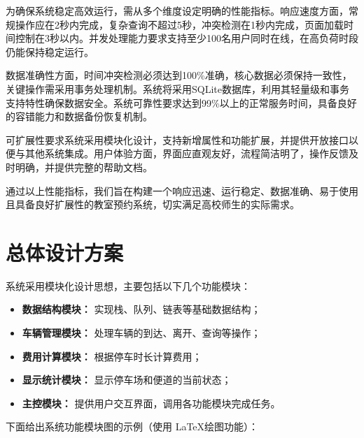 \documentclass[a4paper,12pt,twoside]{ctexrep}
\begin{document}
为确保系统稳定高效运行，需从多个维度设定明确的性能指标。响应速度方面，常规操作应在2秒内完成，复杂查询不超过5秒，冲突检测在1秒内完成，页面加载时间控制在3秒以内。并发处理能力要求支持至少100名用户同时在线，在高负荷时段仍能保持稳定运行。

数据准确性方面，时间冲突检测必须达到100\%准确，核心数据必须保持一致性，关键操作需采用事务处理机制。系统将采用SQLite数据库，利用其轻量级和事务支持特性确保数据安全。系统可靠性要求达到99\%以上的正常服务时间，具备良好的容错能力和数据备份恢复机制。

可扩展性要求系统采用模块化设计，支持新增属性和功能扩展，并提供开放接口以便与其他系统集成。用户体验方面，界面应直观友好，流程简洁明了，操作反馈及时明确，并提供完整的帮助文档。

通过以上性能指标，我们旨在构建一个响应迅速、运行稳定、数据准确、易于使用且具备良好扩展性的教室预约系统，切实满足高校师生的实际需求。
\clearpage
\section{总体设计方案}

系统采用模块化设计思想，主要包括以下几个功能模块：

\begin{itemize}
  \item \textbf{数据结构模块：} 实现栈、队列、链表等基础数据结构；
  \item \textbf{车辆管理模块：} 处理车辆的到达、离开、查询等操作；
  \item \textbf{费用计算模块：} 根据停车时长计算费用；
  \item \textbf{显示统计模块：} 显示停车场和便道的当前状态；
  \item \textbf{主控模块：} 提供用户交互界面，调用各功能模块完成任务。
\end{itemize}

下面给出系统功能模块图的示例（使用 \LaTeX 绘图功能）：
\end{document}
